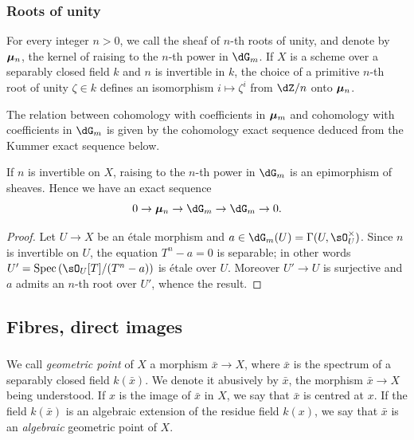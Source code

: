 \subsubsection{Roots of unity}\label{I:2-2-4}

For every integer $n>0$, we call the sheaf of $n$-th roots of 
unity, and denote by ${\bm\mu}_n$, the kernel of raising to the 
$n$-th power in $\dG_m$. If $X$ is a scheme over a separably 
closed field $k$ and $n$ is invertible in $k$, the choice of a primitive 
$n$-th root of unity $\zeta\in k$ defines an isomorphism 
$i\mapsto \zeta^i$ from $\dZ/n$ onto ${\bm\mu}_n$. 

The relation between cohomology with coefficients in ${\bm\mu}_m$ and cohomology with 
coefficients in $\dG_m$ is given by the cohomology exact sequence deduced from the Kummer exact sequence below. 






\begin{theorem}\label{I:2-2-5}
If $n$ is invertible on $X$, raising to the $n$-th power in 
$\dG_m$ is an epimorphism of sheaves. Hence we have an exact sequence 
\[
  0 \to \dmu_n \to \dG_m \to \dG_m \to 0\text{.}
\]
\end{theorem}
\begin{proof}
Let $U\to X$ be an \'etale morphism and $a\in \dG_m(U) =\Gamma(U,\sO_U^\times)$. 
Since $n$ is invertible on $U$, the equation $T^n-a = 0$ is separable; 
in other words $U'=\spec\left(\sO_U[T]/(T^n-a)\right)$ is \'etale over 
$U$. Moreover $U'\to U$ is surjective and $a$ admits an $n$-th root over 
$U'$, whence the result. 
\end{proof}










\subsection{Fibres, direct images}\label{I:2-3}





\subsubsection{}\label{I:2-3-1}

We call \emph{geometric point} of $X$ a morphism $\bar x\to X$, where 
$\bar x$ is the spectrum of a separably closed field $k(\bar x)$. We denote it 
abusively by $\bar x$, the morphism $\bar x\to X$ being understood. If $x$ is 
the image of $\bar x$ in $X$, we say that $\bar x$ is centred at $x$. If the 
field $k(\bar x)$ is an algebraic extension of the residue field $k(x)$, we say 
that $\bar x$ is an \emph{algebraic} geometric point of $X$. 

